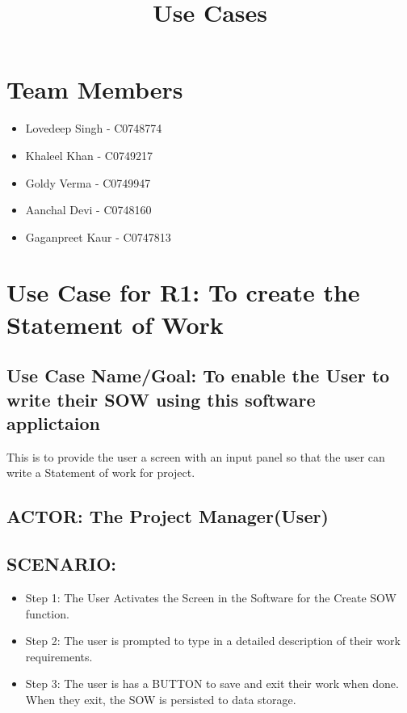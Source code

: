 \documentclass[10pt]{article}
\begin{document}
\title{Use Cases}
\maketitle

\section*{Team Members}
\begin{itemize}
\item Lovedeep Singh - C0748774
\item Khaleel Khan - C0749217
\item Goldy Verma - C0749947
\item Aanchal Devi - C0748160
\item Gaganpreet Kaur - C0747813
\end{itemize}

\section{Use Case for R1: To create the Statement of Work  }
\subsection{Use Case Name/Goal: To enable the User  to write their SOW using this software applictaion}
This is to provide the user a screen with an input panel so that the user can write a Statement of work for project.

\subsection{ACTOR: The Project Manager(User)}

\subsection{SCENARIO: }

\begin{itemize}
  \item Step 1: The User Activates the Screen in the Software for the Create SOW function.
  \item Step 2: The user is prompted to type in a detailed description of their work requirements.
  \item Step 3: The user is has a BUTTON to save and exit their work when done. When they exit, the SOW is persisted to data storage.
\end{itemize}
\end{document}
